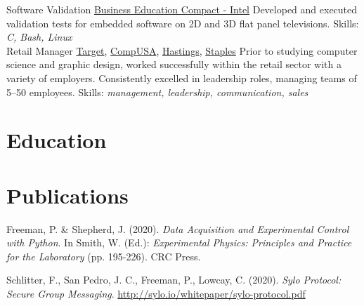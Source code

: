 \documentclass[a4paper]{twentysecondcv}
\begin{document}
\begin{twenty}
           {}
           {Software Validation}
           {\href{https://www.becpdx.org/}{Business Education Compact - Intel}}
           {}
           {Developed and executed validation tests for embedded software on 2D
           and 3D flat panel televisions.
           Skills: \emph{C, Bash, Linux}} \\

           {}
           {Retail Manager}
           {\href{https://www.target.com/}{Target},
           \href{https://en.wikipedia.org/wiki/CompUSA}{CompUSA},
           \href{https://en.wikipedia.org/wiki/Hastings\_Entertainment}{Hastings},
           \href{https://www.staples.com/}{Staples}}
           {}
           {Prior to studying computer science and graphic design, worked
           successfully within the retail sector with a variety of employers.
           Consistently excelled in leadership roles, managing teams of 5--50
           employees.
           Skills: \emph{management, leadership, communication, sales}}

\end{twenty}

\section{Education}
\begin{twenty}
\end{twenty}

\section{Publications}

Freeman, P. \& Shepherd, J. (2020). \emph{Data Acquisition and Experimental
Control with Python}. In Smith, W. (Ed.): \emph{Experimental Physics: Principles and Practice for the
Laboratory} (pp. 195-226). CRC Press.

Schlitter, F., San Pedro, J. C., Freeman, P., Lowcay, C. (2020). \emph{Sylo
Protocol: Secure Group Messaging}. \href{http://sylo.io/whitepaper/sylo-protocol.pdf}{http://sylo.io/whitepaper/sylo-protocol.pdf}
\end{document}
